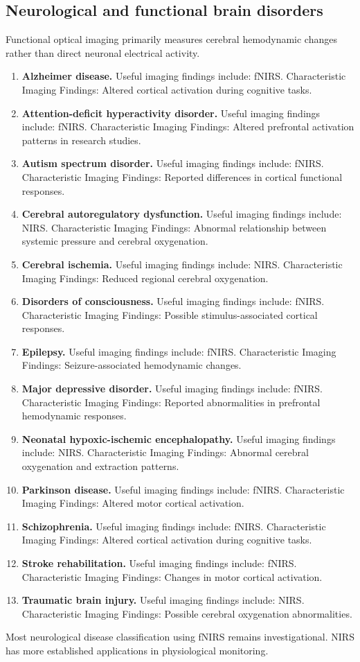 \subsection{Neurological and functional brain disorders}
Functional optical imaging primarily measures cerebral hemodynamic changes rather than direct neuronal electrical activity.
\begin{enumerate}[leftmargin=*,itemsep=0.45em,topsep=0.4em]
\item \textbf{Alzheimer disease.} Useful imaging findings include: fNIRS. Characteristic Imaging Findings: Altered cortical activation during cognitive tasks.
\item \textbf{Attention-deficit hyperactivity disorder.} Useful imaging findings include: fNIRS. Characteristic Imaging Findings: Altered prefrontal activation patterns in research studies.
\item \textbf{Autism spectrum disorder.} Useful imaging findings include: fNIRS. Characteristic Imaging Findings: Reported differences in cortical functional responses.
\item \textbf{Cerebral autoregulatory dysfunction.} Useful imaging findings include: NIRS. Characteristic Imaging Findings: Abnormal relationship between systemic pressure and cerebral oxygenation.
\item \textbf{Cerebral ischemia.} Useful imaging findings include: NIRS. Characteristic Imaging Findings: Reduced regional cerebral oxygenation.
\item \textbf{Disorders of consciousness.} Useful imaging findings include: fNIRS. Characteristic Imaging Findings: Possible stimulus-associated cortical responses.
\item \textbf{Epilepsy.} Useful imaging findings include: fNIRS. Characteristic Imaging Findings: Seizure-associated hemodynamic changes.
\item \textbf{Major depressive disorder.} Useful imaging findings include: fNIRS. Characteristic Imaging Findings: Reported abnormalities in prefrontal hemodynamic responses.
\item \textbf{Neonatal hypoxic-ischemic encephalopathy.} Useful imaging findings include: NIRS. Characteristic Imaging Findings: Abnormal cerebral oxygenation and extraction patterns.
\item \textbf{Parkinson disease.} Useful imaging findings include: fNIRS. Characteristic Imaging Findings: Altered motor cortical activation.
\item \textbf{Schizophrenia.} Useful imaging findings include: fNIRS. Characteristic Imaging Findings: Altered cortical activation during cognitive tasks.
\item \textbf{Stroke rehabilitation.} Useful imaging findings include: fNIRS. Characteristic Imaging Findings: Changes in motor cortical activation.
\item \textbf{Traumatic brain injury.} Useful imaging findings include: NIRS. Characteristic Imaging Findings: Possible cerebral oxygenation abnormalities.
\end{enumerate}
Most neurological disease classification using fNIRS remains investigational. NIRS has more established applications in physiological monitoring.

